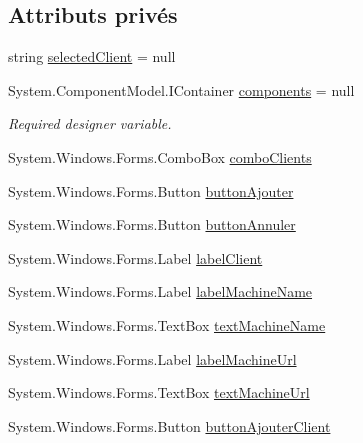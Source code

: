 \subsection*{Attributs privés}
\begin{DoxyCompactItemize}
\item 
string \mbox{\hyperlink{class_m_t_connect_agent_1_1_form_ajout_machine_ab3a8b1ac438fedbb984634be306edc5c}{selected\+Client}} = null
\item 
System.\+Component\+Model.\+I\+Container \mbox{\hyperlink{class_m_t_connect_agent_1_1_form_ajout_machine_a52f1b57913f91bf6d032fe92c6dee576}{components}} = null
\begin{DoxyCompactList}\small\item\em Required designer variable. \end{DoxyCompactList}\item 
System.\+Windows.\+Forms.\+Combo\+Box \mbox{\hyperlink{class_m_t_connect_agent_1_1_form_ajout_machine_aee77af459c269fba5431001f87ab33d3}{combo\+Clients}}
\item 
System.\+Windows.\+Forms.\+Button \mbox{\hyperlink{class_m_t_connect_agent_1_1_form_ajout_machine_a614ac1084888e4aa12b9a27dd006b920}{button\+Ajouter}}
\item 
System.\+Windows.\+Forms.\+Button \mbox{\hyperlink{class_m_t_connect_agent_1_1_form_ajout_machine_a01604f1c9a9ab7a659ca54f5437b44ef}{button\+Annuler}}
\item 
System.\+Windows.\+Forms.\+Label \mbox{\hyperlink{class_m_t_connect_agent_1_1_form_ajout_machine_ac1856bb9d697139f7b5a0fe585fefcef}{label\+Client}}
\item 
System.\+Windows.\+Forms.\+Label \mbox{\hyperlink{class_m_t_connect_agent_1_1_form_ajout_machine_ae7aee960fbe99876ef433d50cc4c19e3}{label\+Machine\+Name}}
\item 
System.\+Windows.\+Forms.\+Text\+Box \mbox{\hyperlink{class_m_t_connect_agent_1_1_form_ajout_machine_aef216554526b007b74247eee491113ff}{text\+Machine\+Name}}
\item 
System.\+Windows.\+Forms.\+Label \mbox{\hyperlink{class_m_t_connect_agent_1_1_form_ajout_machine_adc37ebc1401c7bc29fe5702178280574}{label\+Machine\+Url}}
\item 
System.\+Windows.\+Forms.\+Text\+Box \mbox{\hyperlink{class_m_t_connect_agent_1_1_form_ajout_machine_a851fa7cd322a2229351b91d23e9a404d}{text\+Machine\+Url}}
\item 
System.\+Windows.\+Forms.\+Button \mbox{\hyperlink{class_m_t_connect_agent_1_1_form_ajout_machine_a1506c93a74590c1b28038054ff108d77}{button\+Ajouter\+Client}}
\end{DoxyCompactItemize}


